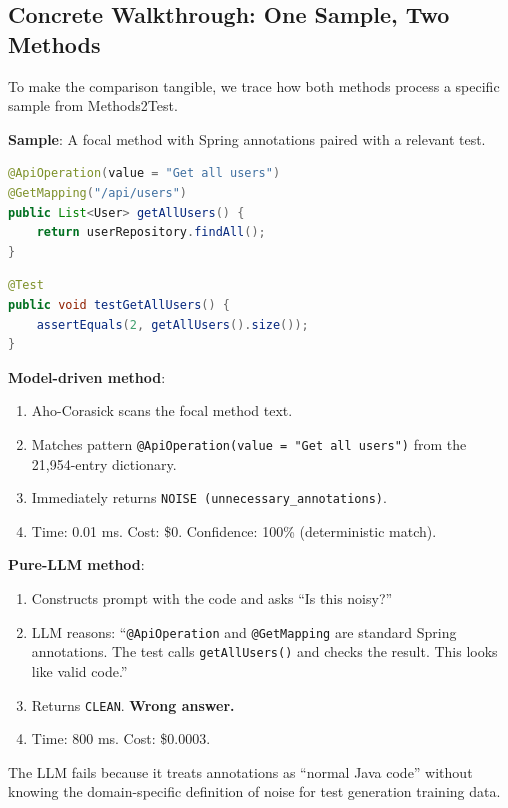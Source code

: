 \documentclass[acmlarge,nonacm,screen]{acmart}
\begin{document}
\subsection{Concrete Walkthrough: One Sample, Two Methods}

To make the comparison tangible, we trace how both methods process a specific sample from Methods2Test.

\textbf{Sample}: A focal method with Spring annotations paired with a relevant test.

\begin{lstlisting}[language=Java,caption={Example focal method with annotation noise}]
@ApiOperation(value = "Get all users")
@GetMapping("/api/users")
public List<User> getAllUsers() {
    return userRepository.findAll();
}
\end{lstlisting}

\begin{lstlisting}[language=Java,caption={Example test case (relevant but paired with noisy focal method)}]
@Test
public void testGetAllUsers() {
    assertEquals(2, getAllUsers().size());
}
\end{lstlisting}

\textbf{Model-driven method}:
\begin{enumerate}
    \item Aho-Corasick scans the focal method text.
    \item Matches pattern \texttt{@ApiOperation(value = "Get all users")} from the 21,954-entry dictionary.
    \item Immediately returns \texttt{NOISE (unnecessary\_annotations)}.
    \item Time: 0.01 ms. Cost: \$0. Confidence: 100\% (deterministic match).
\end{enumerate}

\textbf{Pure-LLM method}:
\begin{enumerate}
    \item Constructs prompt with the code and asks ``Is this noisy?''
    \item LLM reasons: ``\texttt{@ApiOperation} and \texttt{@GetMapping} are standard Spring annotations. The test calls \texttt{getAllUsers()} and checks the result. This looks like valid code.''
    \item Returns \texttt{CLEAN}. \textbf{Wrong answer.}
    \item Time: 800 ms. Cost: \$0.0003.
\end{enumerate}

The LLM fails because it treats annotations as ``normal Java code'' without knowing the domain-specific definition of noise for test generation training data.
\end{document}
